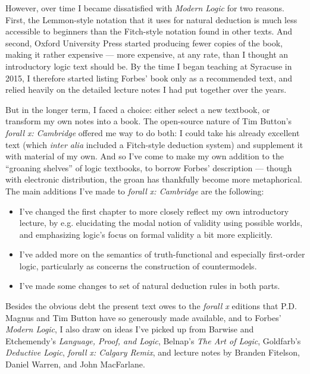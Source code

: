 However, over time I became dissatisfied with \emph{Modern Logic} for two reasons.  First, the Lemmon-style notation that it uses for natural deduction is much less accessible to beginners than the Fitch-style notation found in other texts.  And second, Oxford University Press started producing fewer copies of the book, making it rather expensive --- more expensive, at any rate, than I thought an introductory logic text should be.  By the time I began teaching at Syracuse in 2015, I therefore started listing Forbes' book only as a recommended text, and relied heavily on the detailed lecture notes I had put together over the years.

But in the longer term, I faced a choice: either select a new textbook, or transform my own notes into a book.  The open-source nature of Tim Button's \emph{forall x: Cambridge} offered me way to do both: I could take his already excellent text (which \emph{inter alia} included a Fitch-style deduction system) and supplement it with material of my own.  And so I've come to make my own addition to the ``groaning shelves'' of logic textbooks, to borrow Forbes' description --- though with electronic distribution, the groan has thankfully become more metaphorical. The main additions I've made to \emph{forall x: Cambridge} are the following:
\begin{itemize}
\item I've changed the first chapter to more closely reflect my own introductory lecture, by e.g. elucidating the modal notion of validity using possible worlds, and emphasizing logic's focus on formal validity a bit more explicitly.
\item I've added more on the semantics of truth-functional and especially first-order logic, particularly as concerns the construction of countermodels.  
\item I've made some changes to set of natural deduction rules in both parts.
\end{itemize}
Besides the obvious debt the present text owes to the \emph{forall x} editions that P.D. Magnus and Tim Button have so generously made available,  and to Forbes' \emph{Modern Logic}, I also draw on ideas I've picked up from Barwise and Etchemendy's \emph{Language, Proof, and Logic}, Belnap's \emph{The Art of Logic}, Goldfarb's \emph{Deductive Logic}, \emph{forall x: Calgary Remix}, and lecture notes by Branden Fitelson,  Daniel Warren, and John MacFarlane.


